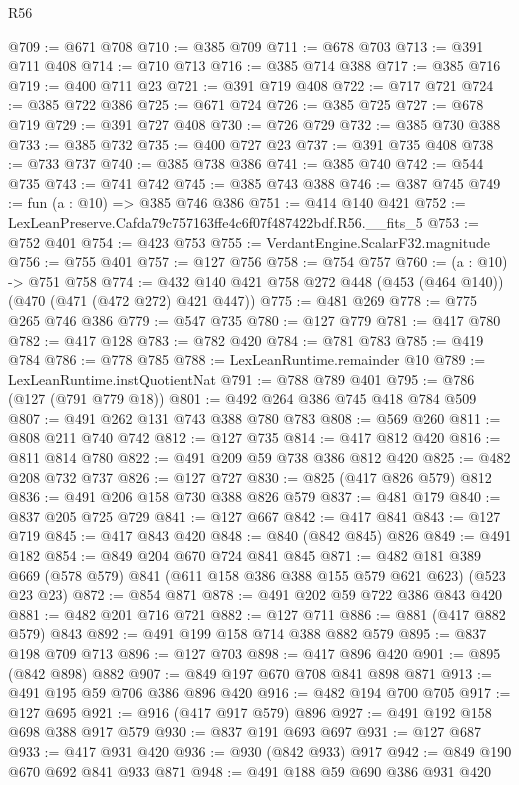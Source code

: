 \begin{lexlean}{R56}
\begin{coremodule}
@709 := @671 @708
@710 := @385 @709
@711 := @678 @703
@713 := @391 @711 @408
@714 := @710 @713
@716 := @385 @714 @388
@717 := @385 @716
@719 := @400 @711 @23
@721 := @391 @719 @408
@722 := @717 @721
@724 := @385 @722 @386
@725 := @671 @724
@726 := @385 @725
@727 := @678 @719
@729 := @391 @727 @408
@730 := @726 @729
@732 := @385 @730 @388
@733 := @385 @732
@735 := @400 @727 @23
@737 := @391 @735 @408
@738 := @733 @737
@740 := @385 @738 @386
@741 := @385 @740
@742 := @544 @735
@743 := @741 @742
@745 := @385 @743 @388
@746 := @387 @745
@749 := fun (a : @10) => @385 @746 @386
@751 := @414 @140 @421
@752 := LexLeanPreserve.Cafda79c757163ffe4c6f07f487422bdf.R56.__fits_5
@753 := @752 @401
@754 := @423 @753
@755 := VerdantEngine.ScalarF32.magnitude
@756 := @755 @401
@757 := @127 @756
@758 := @754 @757
@760 := (a : @10) -> @751 @758
@774 := @432 @140 @421 @758 @272 @448 (@453 (@464 @140)) (@470 (@471 (@472 @272) @421 @447))
@775 := @481 @269
@778 := @775 @265 @746 @386
@779 := @547 @735
@780 := @127 @779
@781 := @417 @780
@782 := @417 @128
@783 := @782 @420
@784 := @781 @783
@785 := @419 @784
@786 := @778 @785
@788 := LexLeanRuntime.remainder @10
@789 := LexLeanRuntime.instQuotientNat
@791 := @788 @789 @401
@795 := @786 (@127 (@791 @779 @18))
@801 := @492 @264 @386 @745 @418 @784 @509
@807 := @491 @262 @131 @743 @388 @780 @783
@808 := @569 @260
@811 := @808 @211 @740 @742
@812 := @127 @735
@814 := @417 @812 @420
@816 := @811 @814 @780
@822 := @491 @209 @59 @738 @386 @812 @420
@825 := @482 @208 @732 @737
@826 := @127 @727
@830 := @825 (@417 @826 @579) @812
@836 := @491 @206 @158 @730 @388 @826 @579
@837 := @481 @179
@840 := @837 @205 @725 @729
@841 := @127 @667
@842 := @417 @841
@843 := @127 @719
@845 := @417 @843 @420
@848 := @840 (@842 @845) @826
@849 := @491 @182
@854 := @849 @204 @670 @724 @841 @845
@871 := @482
    @181
    @389
    @669
    (@578 @579)
    @841
    (@611 @158 @386 @388 @155 @579 @621 @623)
    (@523 @23 @23)
@872 := @854 @871
@878 := @491 @202 @59 @722 @386 @843 @420
@881 := @482 @201 @716 @721
@882 := @127 @711
@886 := @881 (@417 @882 @579) @843
@892 := @491 @199 @158 @714 @388 @882 @579
@895 := @837 @198 @709 @713
@896 := @127 @703
@898 := @417 @896 @420
@901 := @895 (@842 @898) @882
@907 := @849 @197 @670 @708 @841 @898 @871
@913 := @491 @195 @59 @706 @386 @896 @420
@916 := @482 @194 @700 @705
@917 := @127 @695
@921 := @916 (@417 @917 @579) @896
@927 := @491 @192 @158 @698 @388 @917 @579
@930 := @837 @191 @693 @697
@931 := @127 @687
@933 := @417 @931 @420
@936 := @930 (@842 @933) @917
@942 := @849 @190 @670 @692 @841 @933 @871
@948 := @491 @188 @59 @690 @386 @931 @420

\end{coremodule}
\end{lexlean}
